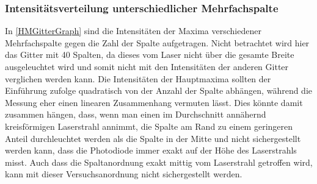 \documentclass[
	a4paper,
	12pt,
	pagesize,
	ngerman
]{scrartcl}
\begin{document}
	\subsubsection{Intensitätsverteilung unterschiedlicher Mehrfachspalte}
	In \cref{HMGitterGraph} sind die Intensitäten der Maxima verschiedener Mehrfachspalte gegen die Zahl der Spalte aufgetragen.
	Nicht betrachtet wird hier das Gitter mit 40 Spalten, da dieses vom Laser nicht über die gesamte Breite ausgeleuchtet wird und somit nicht mit den Intensitäten der anderen Gitter verglichen werden kann.
	Die Intensitäten der Hauptmaxima sollten der Einführung zufolge quadratisch von der Anzahl der Spalte abhängen, während die Messung eher einen linearen Zusammenhang vermuten lässt.
	Dies könnte damit zusammen hängen, dass, wenn man einen im Durchschnitt annähernd kreisförmigen Laserstrahl annimmt, die Spalte am Rand zu einem geringeren Anteil durchleuchtet werden als die Spalte in der Mitte und nicht sichergestellt werden kann, dass die Photodiode immer exakt auf der Höhe des Laserstrahls misst.
	Auch dass die Spaltanordnung exakt mittig vom Laserstrahl getroffen wird, kann mit dieser Versuchsanordnung nicht sichergestellt werden. %
	
\end{document}
